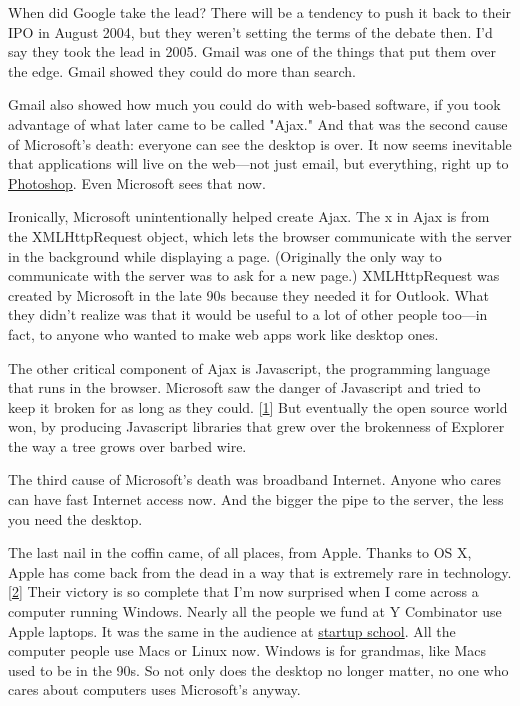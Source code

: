 When did Google take the lead?  There will be a tendency to push
it back to their IPO in August 2004, but they weren't setting the
terms of the debate then.  I'd say they took the lead in
2005.  Gmail was one of the things that put them over the edge.
Gmail showed they could do more than search.

Gmail also showed how much you could do with web-based software,
if you took advantage of what later came to be called "Ajax." And
that was the second cause of Microsoft's death: everyone can see the
desktop is over.  It now seems inevitable that applications will
live on the web---not just email, but everything, right up to
\href{http://snipshot.com}{Photoshop}.  Even Microsoft sees that now.

Ironically, Microsoft unintentionally helped create Ajax.  The x
in Ajax is from the XMLHttpRequest object, which lets the browser
communicate with the server in the background while displaying a page.
(Originally the only way to communicate with the server was to 
ask for a new page.) XMLHttpRequest was created by Microsoft in the late 90s
because they needed it for Outlook.  What they didn't realize was
that it would be useful to a lot of other people too---in fact, to
anyone who wanted to make web apps work like desktop ones.

The other critical component of Ajax is Javascript, the programming
language that runs in the browser.  Microsoft saw the danger of
Javascript and tried to keep it broken for as long as they could.
[\href{\#f1n}{1}] 
But eventually the open source world won, by producing
Javascript libraries that grew over the brokenness of Explorer
the way a tree grows over barbed wire.

The third cause of Microsoft's death was broadband Internet.  Anyone
who cares can have fast Internet access
now.  And the bigger the pipe to the server, the less you need the
desktop.

The last nail in the coffin came, of all places, from Apple.  
Thanks to OS X, Apple has come back from the dead in a way
that is extremely rare in technology.
[\href{\#f2n}{2}]
Their victory is so complete that I'm now surprised when I come across
a computer running Windows.  Nearly all the people we fund at Y
Combinator use Apple laptops.  It was the same in the audience at 
\href{http://www.bosstalks.com/StartupSchool2007/all\_macs\_and\_all\_writing.jpg}{startup
school}.  All the computer people use Macs or Linux now.  Windows is for
grandmas, like Macs used to be in the 90s.  So not only does the
desktop no longer matter, no one who cares about computers uses
Microsoft's anyway.

